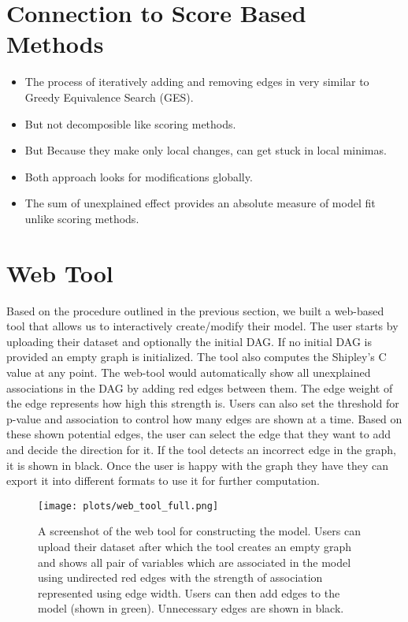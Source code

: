 \documentclass{uai2025} %
\begin{document}
\section{Connection to Score Based Methods}
\begin{itemize}
	\item The process of iteratively adding and removing edges in very similar to
		Greedy Equivalence Search (GES).
	\item But not decomposible like scoring methods. 
	\item But Because they make only local changes, can get stuck in local minimas.
	\item Both approach looks for modifications globally.
	\item The sum of unexplained effect provides an absolute measure of model fit 
		unlike scoring methods.
\end{itemize}

\section{Web Tool}
\label{sec:web}
Based on the procedure outlined in the previous section, we built a web-based
tool that allows us to interactively create/modify their model. The user
starts by uploading their dataset and optionally the initial DAG. If no initial
DAG is provided an empty graph is initialized. The tool also computes the
Shipley's C value at any point. The web-tool would automatically show all
unexplained associations in the DAG by adding red edges between them. The edge
weight of the edge represents how high this strength is. Users can also set the
threshold for p-value and association to control how many edges are shown at a
time. Based on these shown potential edges, the user can select the edge that
they want to add and decide the direction for it. If the tool detects an
incorrect edge in the graph, it is shown in black. Once the user is happy with
the graph they have they can export it into different formats to use it for
further computation.

\begin{figure}
	\centering
	\texttt{[image: plots/web\_tool\_full.png]}
	\caption{A screenshot of the web tool for constructing the model. Users
		can upload their dataset after which the tool creates an empty
		graph and shows all pair of variables which are associated in
		the model using undirected red edges with the strength of
		association represented using edge width. Users can then add
		edges to the model (shown in green). Unnecessary edges are shown in 
		black.}
\end{figure}
\end{document}
